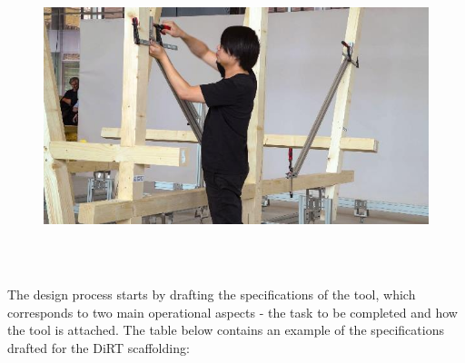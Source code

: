 \documentclass[11pt]{book}
\begin{document}
\begin{figure}[H]
\includegraphics[width=15.92cm,height=8.96cm]{./images/image2.jpeg}
\end{figure}


The design process starts by drafting the specifications of the tool, which corresponds to two main operational aspects - the task to be completed and how the tool is attached. The table below contains an example of the specifications drafted for the DiRT scaffolding:
\end{document}
